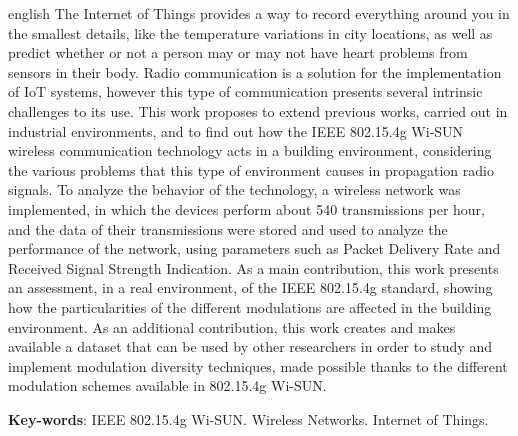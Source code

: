 \begin{resumo}[Abstract]
  \begin{otherlanguage*}{english}
    The Internet of Things provides a way to record everything around you in the smallest details, like the temperature variations in city locations, as well as predict whether or not a person may or may not have heart problems from sensors in their body. Radio communication is a solution for the implementation of IoT systems, however this type of communication presents several intrinsic challenges to its use. This work proposes to extend previous works, carried out in industrial environments, and to find out how the IEEE 802.15.4g Wi-SUN wireless communication technology acts in a building environment, considering the various problems that this type of environment causes in propagation radio signals. To analyze the behavior of the technology, a wireless network was implemented, in which the devices perform about 540 transmissions per hour, and the data of their transmissions were stored and used to analyze the performance of the network, using parameters such as  Packet Delivery Rate and Received Signal Strength Indication. As a main contribution, this work presents an assessment, in a real environment, of the IEEE 802.15.4g standard, showing how the particularities of the different modulations are affected in the building environment. As an additional contribution, this work creates and makes available a dataset that can be used by other researchers in order to study and implement modulation diversity techniques, made possible thanks to the different modulation schemes available in 802.15.4g Wi-SUN.


    \vspace{\onelineskip}

    \noindent
    \textbf{Key-words}: IEEE 802.15.4g Wi-SUN. Wireless Networks. Internet of Things.
  \end{otherlanguage*}
\end{resumo}




